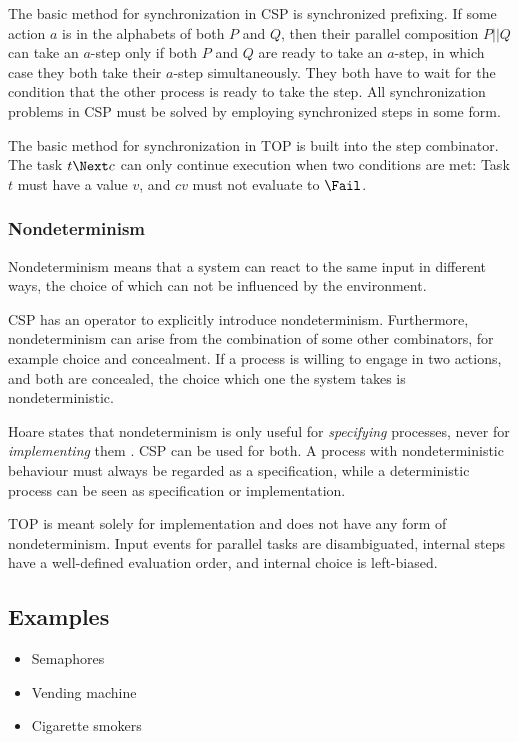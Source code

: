 The basic method for synchronization in CSP is synchronized prefixing.
If some action $a$ is in the alphabets of both $P$ and $Q$, then their parallel composition $P||Q$ can take an $a$-step only if both $P$ and $Q$ are ready to take an $a$-step, in which case they both take their $a$-step simultaneously.
They both have to wait for the condition that the other process is ready to take the step.
All synchronization problems in CSP must be solved by employing synchronized steps in some form.

The basic method for synchronization in TOP is built into the step combinator.
The task $t \Next c$ can only continue execution when two conditions are met:
Task $t$ must have a value $v$, and $cv$ must not evaluate to $\Fail$.


\subsubsection*{Nondeterminism}

Nondeterminism means that a system can react to the same input in different ways, the choice of which can not be influenced by the environment.

CSP has an operator to explicitly introduce nondeterminism.
Furthermore, nondeterminism can arise from the combination of some other combinators, for example choice and concealment.
If a process is willing to engage in two actions, and both are concealed, the choice which one the system takes is nondeterministic.

Hoare states that nondeterminism is only useful for \emph{specifying} processes, never for \emph{implementing} them \cite{books/Hoare85CSP}.
CSP can be used for both.
A process with nondeterministic behaviour must always be regarded as a specification, while a deterministic process can be seen as specification or implementation.

TOP is meant solely for implementation and does not have any form of nondeterminism.
Input events for parallel tasks are disambiguated, internal steps have a well-defined evaluation order, and internal choice is left-biased.


\subsection{Examples}

\begin{itemize}
\item Semaphores
\item Vending machine
\item Cigarette smokers
\end{itemize}
